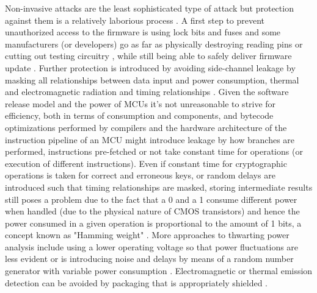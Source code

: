 Non-invasive attacks are the least sophisticated type of attack but protection against them is a relatively laborious process \citep{anderson:cautionary_note}. A first step to prevent unauthorized access to the firmware is using lock bits and fuses \citep{atmega_manual} \citep{tech:avrfreaks} and some manufacturers (or developers) go as far as physically destroying reading pins or cutting out testing circuitry \citep{sergei:thesis}, while still being able to safely deliver firmware update \citep{tech:aes_bls}. Further protection is introduced by avoiding side-channel leakage by masking all relationships between data input and power consumption, thermal and electromagnetic radiation and timing relationships \citep{kocher:DPA} \cite{sergei:thesis}. Given the software release model and the power of MCUs it's not unreasonable to strive for efficiency, both in terms of consumption and components, and bytecode optimizations performed by compilers and the hardware architecture of the instruction pipeline of an MCU might introduce leakage \citep{kocher:DPA}  \citep{sergei:thesis} by how branches are performed, instructions pre-fetched or not take constant time for operations (or execution of different instructions). Even if constant time for cryptographic operations is taken for correct and erroneous keys, or random delays are introduced such that timing relationships are masked, storing intermediate results still poses a problem due to the fact that a 0 and a 1 consume different power when handled (due to the physical nature of CMOS transistors) and hence the power consumed in a given operation is proportional to the amount of 1 bits, a concept known as "Hamming weight" \citep{website:riscure} \citep{kocher:DPA}. More approaches to thwarting power analysis include using a lower operating voltage so that power fluctuations are less evident or is introducing noise and delays by means of a random number generator with variable power consumption \citep{kocher:DPA} \citep{hwre} \citep{avr_mega}. Electromagnetic or thermal emission detection can be avoided by packaging that is appropriately shielded \citep{website:ibm_secure} \citep{kocher:DPA}. 

